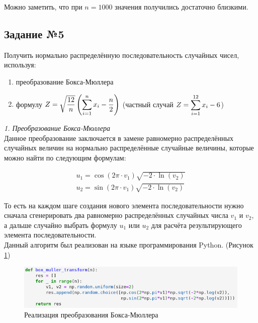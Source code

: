 \documentclass[14pt,fleqn]{extarticle}
\begin{document}
	Можно заметить, что при $n = 1000$ значения получились достаточно близкими.
	
	\newpage
	
	\subsection*{Задание №5}
	Получить нормально распределённую последовательность случайных чисел, используя:
	\begin{enumerate}[topsep=0pt,itemsep=-1ex,partopsep=1ex,parsep=1ex]
		\item преобразование Бокса-Мюллера
		\item формулу $Z = \sqrt{\dfrac{12}{n}}\left(\smashoperator[r]{\sum_{i=1}^{n}} x_i - \dfrac{n}{2}\right)$ (частный случай $Z = \smashoperator[r]{\sum_{i=1}^{12}} x_i - 6$)
	\end{enumerate}

	\vspace{1cm}
	
	\textit{1. Преобразование Бокса-Мюллера}\\

	Данное преобразование заключается в замене равномерно распределённых случайных величин на нормально распределённые случайные величины, которые можно найти по следующим формулам:
	\begin{ceqn}
	\begin{align*}
		u_1 = \cos(2 \pi \cdot v_1) \sqrt{-2 \cdot \ln(v_2)}\\
		u_2 = \sin(2 \pi \cdot v_1) \sqrt{-2 \cdot \ln(v_2)}
	\end{align*}
	\end{ceqn}
	То есть на каждом шаге создания нового элемента последовательности нужно сначала сгенерировать два равномерно распределённых случайных числа $v_1$ и $v_2$, а дальше случайно выбрать формулу $u_1$ или $u_2$ для расчёта результирующего элемента последовательности.\\
	
	
	Данный алгоритм был реализован на языке программирования Python. (Рисунок \ref{fig:box_muller_transform_code})
	\begin{figure}[h]
		\centering \includegraphics[scale=0.65]{box_muller_transform_code}
		\caption{Реализация преобразования Бокса-Мюллера}
		\label{fig:box_muller_transform_code}
	\end{figure}
	
\end{document}

